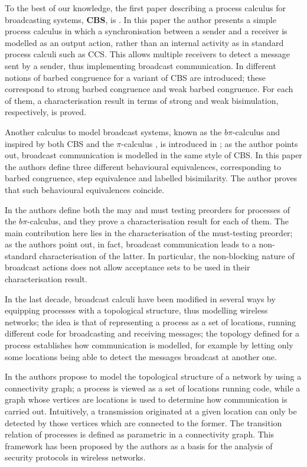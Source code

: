 \documentclass{LMCS}
\begin{document}
To the best of our knowledge, the first paper describing a process calculus for broadcasting systems, \textbf{CBS}, is 
\cite{Prasad95}. In this paper the author presents a simple process calculus 
in which a synchronisation between a sender and a receiver is modelled as an 
output action, rather than an internal activity as in standard 
process calculi such as CCS. This allows multiple receivers to detect 
a message sent by a sender, thus implementing broadcast communication. 
In \cite{HenRat98} different notions of barbed congruence for a variant of CBS are introduced; 
these correspond to strong barbed congruence and weak barbed congruence. For each of 
them, a characterisation result in terms of strong and weak bisimulation, 
respectively, is proved. 

Another calculus to model broadcast systems, known as the $b\pi$-calculus 
and inspired by both CBS and the $\pi$-calculus \cite{pibook}, is introduced in \cite{Ene01}; 
as the author points out, broadcast communication is modelled in the same style of 
CBS. In this paper the authors define three different behavioural equivalences, 
corresponding to barbed congruence, step equivalence and labelled bisimilarity. 
The author proves that such behavioural equivalences coincide. 

In \cite{Ene02} the authors define both the may and must testing preorders for processes of the 
$b\pi$-calculus, and they prove a characterisation result for each of them. 
The main contribution here lies in the characterisation of the must-testing 
preorder; as the authors point out, in fact, broadcast communication leads 
to a non-standard characterisation of the latter. In particular, the non-blocking 
nature of broadcast actions does not allow acceptance sets to be used in their 
characterisation result.

In the last decade, broadcast calculi have been modified in several ways by 
equipping processes with a topological structure, thus modelling wireless 
networks; the idea is that 
of representing a process as a set of locations, running different code 
for broadcasting and receiving messages; the topology defined for a process 
establishes how communication is modelled, for example by letting only some 
locations being able to detect the messages broadcast at another one.

In \cite{NanHan06} the authors propose to model the topological 
structure of a network by using a connectivity graph; a process 
is viewed as a set of locations running code, while a graph 
whose vertices are locations 
is used to determine how communication is carried out. Intuitively, 
a transmission originated at a given location can only be detected 
by those vertices which are connected to the former. The transition 
relation of processes is defined as parametric in a connectivity graph. 
This framework has been proposed by the authors as a basis for the 
analysis of security protocols in wireless networks.
\end{document}
